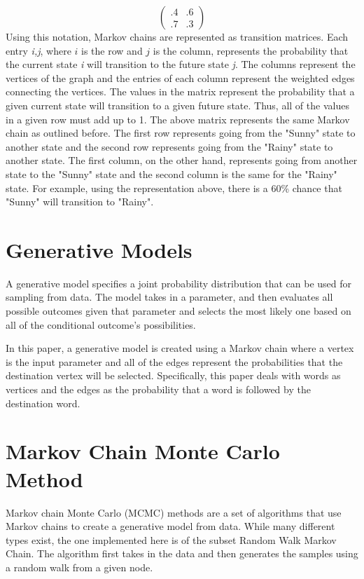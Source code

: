 \documentclass[9pt,twocolumn,twoside]{idsi}
\begin{document}
    \begin{equation}
		\left(\begin{array}{cc} .4 & .6\\ .7 & .3\end{array}\right)
	\end{equation}
    Using this notation, Markov chains are represented as transition matrices. Each entry \textit{i,j}, where $i$ is the row and $j$ is the column, represents the probability that the current state \textit{i} will transition to the future state \textit{j}. The columns represent the vertices of the graph and the entries of each column represent the weighted edges connecting the vertices.  
The values in the matrix represent the probability that a given current state will transition to a given future state. Thus, all of the values in a given row must add up to 1. 
    The above matrix represents the same Markov chain as outlined before. The first row represents going from the "Sunny" state to another state and the second row represents going from the "Rainy" state to another state. The first column, on the other hand, represents going from another state to the "Sunny" state and the second column is the same for the "Rainy" state. For example, using the representation above, there is a 60\% chance that "Sunny" will transition to "Rainy".  

\section{Generative Models}
A generative model specifies a joint probability distribution that can be used for sampling from data. The model takes in a parameter, and then evaluates all possible outcomes given that parameter and selects the most likely one based on all of the conditional outcome's possibilities. \cite{Ng:5}

In this paper, a generative model is created using a Markov chain where a vertex is the input parameter and all of the edges represent the probabilities that the destination vertex will be selected. Specifically, this paper deals with words as vertices and the edges as the probability that a word is followed by the destination word. 

\section{Markov Chain Monte Carlo Method}
Markov chain Monte Carlo (MCMC) methods are a set of algorithms that use Markov chains to create a generative model from data. While many different types exist, the one implemented here is of the subset Random Walk Markov Chain.
The algorithm first takes in the data and then generates the samples using a random walk from a given node. 
\end{document}
